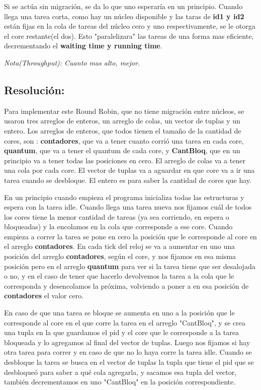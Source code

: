 \documentclass[10pt, a4paper]{article}
\begin{document}
Si se actúa sin migración, se da lo que uno esperaría en un principio. Cuando llega una tarea corta, como hay un núcleo disponible y las taras de \textbf{id1 y id2} están fijas en la cola de tareas del núcleo cero y uno respectivamente, se le otorga el core restante(el dos). Esto "paralelizara" las tareas de una forma mas eficiente, decrementando el \textbf{waiting time y running time}.



\textit{Nota(Throughput): Cuanto mas alto, mejor.}




\subsection{Resolución:}

Para implementar este Round Robin, que no tiene migración entre núcleos, se usaron tres arreglos de enteros, un arreglo de colas, un vector de tuplas y un entero. Los arreglos de enteros, que todos tienen el tamaño de la cantidad de cores, son : \textbf{contadores}, que va a tener cuanto corrió una tarea en cada core, \textbf{quantum}, que va a tener el quantum de cada core, y \textbf{CantBloq}, que en un principio va a tener todas las posiciones en cero. El arreglo de colas va a tener una cola por cada core. El vector de tuplas va a aguardar en que core va a ir una tarea cuando se desbloque. El entero es para saber la cantidad de cores que hay.

En un principio cuando empieza el programa inicializa todas las estructuras y espera con la tarea idle. Cuando llega una tarea nueva nos fijamos cuál de todos los cores tiene la menor cantidad de tareas (ya sea corriendo, en espera o bloqueadas) y la encolamos en la cola que corresponde a ese core. Cuando empieza a correr la tarea se pone en cero la posición que le corresponde al core en el arreglo \textbf{contadores}. En cada tick del reloj se va a aumentar en uno una posición  del arreglo \textbf{contadores}, según el core, y nos fijamos en esa misma posición pero en el arreglo \textbf{quantum} para ver si la tarea tiene que ser desalojada o no, y en el caso de tener que hacerlo devolvemos la tarea a la cola que le corresponda y desencolamos la próxima, volviendo a poner a en esa posición de \textbf{contadores} el valor cero.

En caso de que una tarea se bloque se aumenta en uno a la posición que le corresponde al core en el que corre la tarea en el arreglo "CantBloq", y se crea una tupla en la que guardamos el pid y el core que le corresponde a la tarea bloqueada y lo agregamos al final del vector de tuplas. Luego nos fijamos si hay otra tarea para correr y en caso de que no lo haya corre la tarea idle. Cuando se desbloque la tarea se busca en el vector de tuplas la tupla que tiene el pid que se desbloqueó para saber a qué cola agregarla, y sacamos esa tupla del vector, también decrementamos en uno "CantBloq" en la posición correspondiente.
\end{document}
